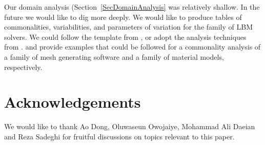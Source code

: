 \documentclass[final, 3p, times, authoryear]{elsarticle}
\begin{document}
Our domain analysis (Section~\ref{SecDomainAnalysis} was relatively shallow.  In
the future we would like to dig more deeply.  We would like to produce tables of
commonalities, variabilities, and parameters of variation for the family of LBM
solvers. We could follow the template from \citep{smith2008commonality}, or
adopt the analysis techniques from \citep{weiss1998commonality}.
\citet{SmithAndChen2004} and \citet{SmithMcCutchanAndCarette2017} provide
examples that could be followed for a commonality analysis of a family of mesh
generating software and a family of material models, respectively.

\section*{Acknowledgements}

We would like to thank Ao Dong, Oluwaseun Owojaiye, Mohammad Ali Daeian and Reza
Sadeghi for fruitful discussions on topics relevant to this paper.



\end{document}
